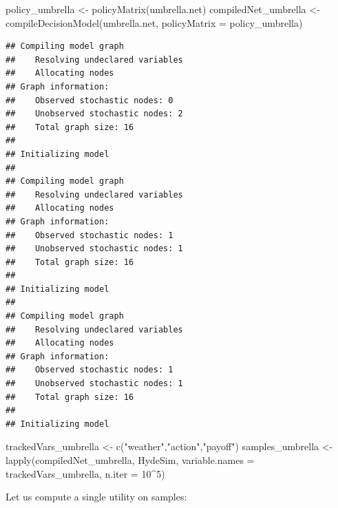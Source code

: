 \documentclass[
]{article}
\newenvironment{Shaded}{\begin{snugshade}}{\end{snugshade}}
\newcommand{\AttributeTok}[1]{\textcolor[rgb]{0.77,0.63,0.00}{#1}}
\newcommand{\ControlFlowTok}[1]{\textcolor[rgb]{0.13,0.29,0.53}{\textbf{#1}}}
\newcommand{\DecValTok}[1]{\textcolor[rgb]{0.00,0.00,0.81}{#1}}
\newcommand{\FunctionTok}[1]{\textcolor[rgb]{0.00,0.00,0.00}{#1}}
\newcommand{\NormalTok}[1]{#1}
\newcommand{\OtherTok}[1]{\textcolor[rgb]{0.56,0.35,0.01}{#1}}
\newcommand{\SpecialCharTok}[1]{\textcolor[rgb]{0.00,0.00,0.00}{#1}}
\newcommand{\StringTok}[1]{\textcolor[rgb]{0.31,0.60,0.02}{#1}}
\begin{document}
\begin{Shaded}
\begin{Highlighting}[]
\NormalTok{policy\_umbrella }\OtherTok{\textless{}{-}} \FunctionTok{policyMatrix}\NormalTok{(umbrella.net)}
\NormalTok{compiledNet\_umbrella }\OtherTok{\textless{}{-}} \FunctionTok{compileDecisionModel}\NormalTok{(umbrella.net, }\AttributeTok{policyMatrix =}\NormalTok{ policy\_umbrella)}
\end{Highlighting}
\end{Shaded}

\begin{verbatim}
## Compiling model graph
##    Resolving undeclared variables
##    Allocating nodes
## Graph information:
##    Observed stochastic nodes: 0
##    Unobserved stochastic nodes: 2
##    Total graph size: 16
## 
## Initializing model
## 
## Compiling model graph
##    Resolving undeclared variables
##    Allocating nodes
## Graph information:
##    Observed stochastic nodes: 1
##    Unobserved stochastic nodes: 1
##    Total graph size: 16
## 
## Initializing model
## 
## Compiling model graph
##    Resolving undeclared variables
##    Allocating nodes
## Graph information:
##    Observed stochastic nodes: 1
##    Unobserved stochastic nodes: 1
##    Total graph size: 16
## 
## Initializing model
\end{verbatim}

\begin{Shaded}
\begin{Highlighting}[]
\NormalTok{trackedVars\_umbrella }\OtherTok{\textless{}{-}} \FunctionTok{c}\NormalTok{(}\StringTok{"weather"}\NormalTok{,}\StringTok{"action"}\NormalTok{,}\StringTok{"payoff"}\NormalTok{)}
\NormalTok{samples\_umbrella }\OtherTok{\textless{}{-}} \FunctionTok{lapply}\NormalTok{(compiledNet\_umbrella,}
\NormalTok{                     HydeSim,}
                     \AttributeTok{variable.names =}\NormalTok{ trackedVars\_umbrella,}
                     \AttributeTok{n.iter =} \DecValTok{10}\SpecialCharTok{\^{}}\DecValTok{5}\NormalTok{)}
\end{Highlighting}
\end{Shaded}

Let us compute a single utility on samples:

\begin{Shaded}
\end{Shaded}
\end{document}
